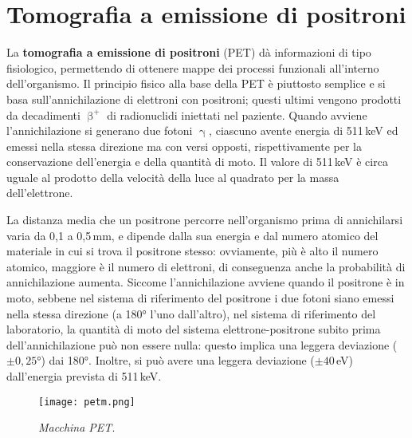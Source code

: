 \documentclass{report}
\numberwithin{equation}{section}
\numberwithin{figure}{section}
\begin{document}
\section{Tomografia a emissione di positroni}
La \textbf{tomografia a emissione di positroni} (PET) dà informazioni di tipo fisiologico, permettendo di ottenere mappe dei processi funzionali all'interno dell'organismo. Il principio fisico alla base della PET è piuttosto semplice e si basa sull'annichilazione di elettroni con positroni; questi ultimi vengono prodotti da decadimenti $\upbeta^+$ di radionuclidi iniettati nel paziente. Quando avviene l'annichilazione si generano due fotoni $\upgamma$, ciascuno avente energia di 511\,keV ed emessi nella stessa direzione ma con versi opposti, rispettivamente per la conservazione dell'energia e della quantità di moto. Il valore di 511\,keV è circa uguale al prodotto della velocità della luce al quadrato per la massa dell'elettrone.

La distanza media che un positrone percorre nell'organismo prima di annichilarsi varia da 0,1 a 0,5\,mm, e dipende dalla sua energia e dal numero atomico del materiale in cui si trova il positrone stesso: ovviamente, più è alto il numero atomico, maggiore è il numero di elettroni, di conseguenza anche la probabilità di annichilazione aumenta. Siccome l'annichilazione avviene quando il positrone è in moto, sebbene nel sistema di riferimento del positrone i due fotoni siano emessi nella stessa direzione (a 180° l'uno dall'altro), nel sistema di riferimento del laboratorio, la quantità di moto del sistema elettrone-positrone subito prima dell'annichilazione può non essere nulla: questo implica una leggera deviazione ($\pm 0,25$°) dai 180°. Inoltre, si può avere una leggera deviazione ($\pm 40$\,eV) dall'energia prevista di 511\,keV.

\begin{wrapfigure}{R}{0.55\textwidth}
    \centering
    \texttt{[image: petm.png]}
    \caption{\textit{Macchina PET}.}
    \label{fig:petm}
\end{wrapfigure}
\end{document}
